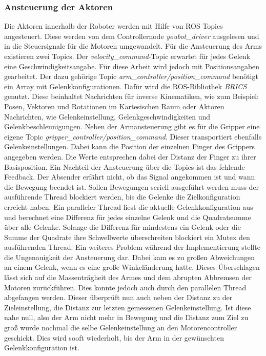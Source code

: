 \subsubsection{Ansteuerung der Aktoren}
\label{sec:impl-res-ak}
Die Aktoren innerhalb der Roboter werden mit Hilfe von ROS Topics angesteuert. Diese werden von dem Controllernode \textit{youbot\_driver} ausgelesen und in die Steuersignale für die Motoren umgewandelt. Für die Ansteuerung des Arms existieren zwei Topics. Der \textit{velocity\_command}-Topic erwartet für jedes Gelenk eine Geschwindigkeitsangabe. Für diese Arbeit wird jedoch mit Positionsangaben gearbeitet. Der dazu gehörige Topic \textit{arm\_controller/position\_command} benötigt ein Array mit Gelenkkonfigurationen. Dafür wird die ROS-Bibliothek \textit{BRICS} genutzt. Diese beinhaltet Nachrichten für inverse Kinematiken, wie zum  Beispiel: Posen, Vektoren und Rotationen im Kartesischen Raum oder Aktoren Nachrichten, wie Gelenkeinstellung, Gelenkgeschwindigkeiten und Gelenkbeschleunigungen. Neben der Armansteuerung gibt es für die Gripper eine eigene Topic \textit{gripper\_controller/position\_command}. Dieser transportiert ebenfalls Gelenkeinstellungen. Dabei kann die Position der einzelnen Finger des Grippers angegeben werden. Die Werte entsprechen dabei der Distanz der Finger zu ihrer Basisposition. Ein Nachteil der Ansteuerung über die Topics ist das fehlende Feedback. Der Absender erfährt nicht, ob das Signal angekommen ist und wann die Bewegung beendet ist. Sollen Bewegungen seriell ausgeführt werden muss der ausführende Thread blockiert werden, bis die Gelenke die Zielkonfiguration erreicht haben.  Ein paralleler Thread liest die aktuelle Gelenkkonfiguration aus und berechnet eine Differenz für jedes einzelne Gelenk und die Quadratsumme über alle Gelenke. Solange die Differenz für mindestens ein Gelenk oder die Summe der Quadrate ihre Schwellwerte überschreiten blockiert ein Mutex den ausführenden Thread. Ein weiteres Problem während der Implementierung stellte die Ungenauigkeit der Ansteuerung dar. Dabei kam es zu großen Abweichungen an einem Gelenk, wenn es eine große Winkeländerung hatte. Dieses Überschlagen lässt sich auf die Massenträgheit des Armes und dem abrupten Abbremsen der Motoren zurückführen. Dies konnte jedoch auch durch den parallelen Thread abgefangen werden. Dieser überprüft nun auch neben der Distanz zu der Zieleinstellung, die Distanz zur letzten gemessenen Gelenkeinstellung. Ist diese nahe null, also der Arm nicht mehr in Bewegung und die Distanz zum Ziel zu groß wurde nochmal die selbe Gelenkeinstellung an den Motorencontroller geschickt. Dies wird sooft wiederholt, bis der Arm in der gewünschten Gelenkkonfiguration ist. 

